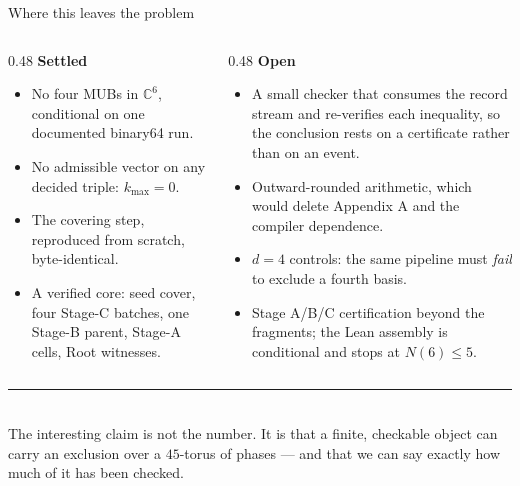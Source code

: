 \documentclass[aspectratio=169,10pt]{beamer}
\newcommand{\C}{\mathbb{C}}
\begin{document}
\begin{frame}{Where this leaves the problem}
  \small
  \begin{columns}[T]
  \begin{column}{0.48\textwidth}
    \textbf{Settled}
    \begin{itemize}
      \item No four MUBs in $\C^6$, conditional on one documented binary64 run.
      \item No admissible vector on any decided triple: $k_{\max}=0$.
      \item The covering step, reproduced from scratch, byte-identical.
      \item A verified core: seed cover, four Stage-C batches, one Stage-B parent, Stage-A cells,
            Root witnesses.
    \end{itemize}
  \end{column}
  \begin{column}{0.48\textwidth}
    \textbf{Open}
    \begin{itemize}
      \item A small checker that consumes the record stream and re-verifies each inequality,
            so the conclusion rests on a certificate rather than on an event.
      \item Outward-rounded arithmetic, which would delete Appendix A and the compiler dependence.
      \item $d=4$ controls: the same pipeline must \emph{fail} to exclude a fourth basis.
      \item Stage A/B/C certification beyond the fragments; the Lean assembly is conditional and
            stops at $N(6)\le5$.
    \end{itemize}
  \end{column}
  \end{columns}
  \vfill
  \begin{center}
    {\color{acc}\rule{30mm}{1.6pt}}\\[2mm]
    {\small The interesting claim is not the number. It is that a finite, checkable object can
    carry an exclusion over a $45$-torus of phases --- and that we can say exactly how much of it
    has been checked.}
  \end{center}
\end{frame}
\end{document}
